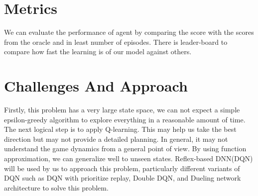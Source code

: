 \documentclass[12pt]{article}
\begin{document}
\section{Metrics}
We can evaluate the performance of agent by comparing the score with the scores from the oracle and in least number of episodes. There is leader-board to compare how fast the learning is of our model against others.\citep{leaderboard}

\section{Challenges And Approach}

Firstly, this problem has a very large state space, we can not expect a simple epsilon-greedy algorithm to explore everything in a reasonable amount of time. The next logical step is to apply Q-learning. This may help us take the best direction but may not provide a detailed planning. In general, it may not understand the game dynamics from a general point of view. By using function approximation, we can generalize well to unseen states. Reflex-based DNN(DQN) will be used by us to approach this problem, particularly different variants of DQN such as DQN with prioritize replay\citep{PrioritizedReplay}, Double DQN\citep{DoubleQ-learning}, and Dueling network architecture \citep{Dueling} to solve this problem.



\end{document}

